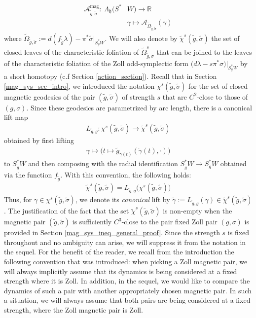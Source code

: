 \documentclass[11pt]{amsart}
\theoremstyle{plain}
\theoremstyle{definition}
\theoremstyle{remark}
\begin{document}
\begin{align}\label{mag_action_def_eqn}
\mathcal{A}^{\text{mag}}_{\tilde g,\tilde \sigma}:\; \Lambda_{\mathfrak{h}}(S^*&W) \rightarrow \mathbb{R}\\\nonumber
    &\gamma\mapsto \mathcal{A}_{\tilde \Omega_{\tilde g,\tilde \sigma}}(\gamma)
\end{align}
where $\tilde \Omega_{\tilde g,\tilde \sigma}:= d(f_{\tilde g}\lambda)-\pi^*\tilde\sigma\big|_{S_g^*W}$. We will also denote by $\tilde \chi^{s}(\tilde g, \tilde \sigma)$ the set of closed leaves of the characteristic foliation of $\tilde \Omega^{s}_{\tilde g,\tilde \sigma}$ that can be joined to the leaves of the characteristic foliation of the Zoll odd-symplectic form $\big(d\lambda-s\pi^*\sigma\big)\big\vert_{S_g^*W}$ by a short homotopy (c.f Section \ref{action_section}). Recall that in Section \ref{mag_sys_sec_intro}, we introduced the notation
$\chi^{s}(\tilde g,\tilde \sigma)$ for the set of closed magnetic geodesics of the
pair $(\tilde g,\tilde \sigma)$ of strength $s$ that are $C^2$-close to those of $(g,\sigma)$.
Since these geodesics are parametrized by arc length, there is a canonical lift map
\begin{align}
    L_{\tilde g,g}:\chi^{s}(\tilde g,\tilde \sigma)\longrightarrow
\tilde \chi^{s}(\tilde g,\tilde \sigma)
\end{align}
obtained by first lifting
\begin{align}
    \gamma \mapsto \big(t\mapsto \tilde g_{\gamma(t)}(\dot\gamma(t),\cdot)\big)
\end{align}
to $S^*_{\tilde g}W$ and then composing with the radial identification
$S^*_{\tilde g}W \rightarrow S^*_gW$ obtained via the function $f_{\tilde g}$. With this convention, the following holds:
\begin{align}
    \tilde \chi^{s}(\tilde g,\tilde \sigma)
=
L_{\tilde g,g}\big(\chi^{s}(\tilde g,\tilde \sigma)\big)
\end{align}
Thus, for $\gamma\in \chi^{s}(\tilde g,\tilde \sigma)$, we denote its \emph{canonical}
lift by $\tilde\gamma:= L_{\tilde g,g}(\gamma) \in \tilde \chi^{s}(\tilde g,\tilde \sigma)$. The justification of the fact that the set $\tilde \chi^{s}(\tilde g,\tilde \sigma)$ is non-empty when the magnetic pair $(\tilde g,\tilde \sigma)$ is sufficiently $C^3$-close to the pair fixed Zoll pair $(g,\sigma)$ is provided in Section \ref{mag_sys_ineq_general_proof}. Since the strength $s$ is fixed throughout and no ambiguity can arise, we will suppress it from the notation in the sequel. For the benefit of the reader, we recall from the introduction the following convention that was introduced: when picking a Zoll magnetic pair, we will always implicitly assume that its dynamics is being considered at a fixed strength where it is Zoll. In addition, in the sequel, we would like to compare the dynamics of such a pair with another appropriately chosen magnetic pair. In such a situation, we will always assume that both pairs are being considered at a fixed strength, where the Zoll magnetic pair is Zoll.\\
\end{document}

